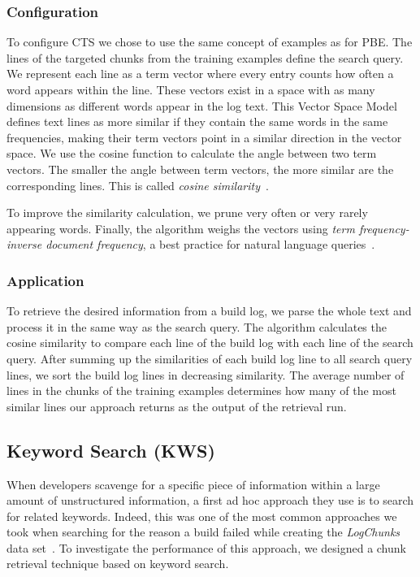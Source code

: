 \subsubsection{Configuration}
To configure CTS we chose to use
the same concept of examples as for PBE.
The lines of the targeted chunks from the training examples define the
search query.
We represent each line as a term vector where every entry counts
how often a word appears within the line.
These vectors exist in a space with as many dimensions as different
words appear in the log text.
This Vector Space Model~\cite{schutze2008introduction} defines
text lines as more similar if they contain the same words in the same
frequencies, making their term vectors point in a similar direction
in the vector space.
We use the cosine function to calculate the angle between two
term vectors.
The smaller the angle between term vectors, the more similar are the
corresponding lines.
This is called \emph{cosine similarity}~\cite{korenius2007principal}.

To improve the similarity calculation, we prune very often or
very rarely appearing words.
Finally, the
algorithm weighs the vectors using \emph{term frequency-inverse
document frequency}, a best practice for natural
language queries~\cite{lee1997document}.

\subsubsection{Application}
To retrieve the desired information from a build log, we parse the
whole text and process it in the same way as the search query.
The algorithm calculates the cosine
similarity to compare each line of the
build log with each line of the search query.
After summing up the
similarities of each build log line to all search query lines, we sort
the build log lines in decreasing similarity.
The average number of
lines in the chunks of the training examples determines how many of
the most similar lines our approach returns as the output of the retrieval
run.

\subsection{Keyword Search (KWS)}
When developers scavenge for a specific piece of information within a
large amount of unstructured information, a first ad hoc approach they
use is to search for related keywords.
Indeed, this was one of the
most common approaches we took when searching for the reason a build
failed while creating the \emph{LogChunks} data
set~\cite{brandt2020logchunks}.
To investigate the performance of this approach, we
designed a chunk retrieval technique based on keyword search.

